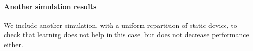 \paragraph{Another simulation results}

We include another simulation, with a uniform repartition of static device, to check that learning does not help in this case, but does not decrease performance either.


\begin{figure}[!t]
    \centering
    \hfill
\end{figure}
